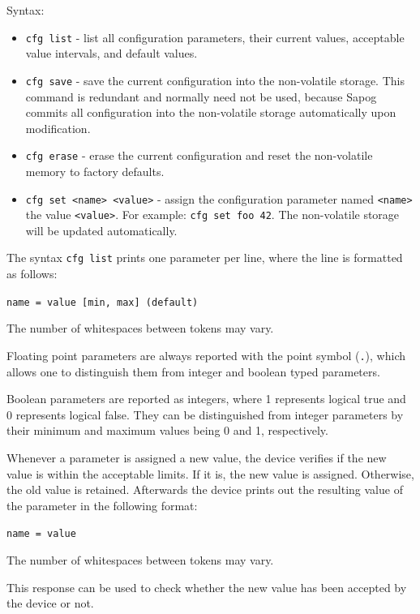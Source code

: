 \documentclass{zubaxdoc}
\begin{document}
Syntax:
\begin{itemize}
    \item \verb|cfg list| - list all configuration parameters, their current values,
          acceptable value intervals, and default values.
    
    \item \verb|cfg save| - save the current configuration into the non-volatile storage.
          This command is redundant and normally need not be used, because Sapog commits all configuration
          into the non-volatile storage automatically upon modification.
    
    \item \verb|cfg erase| - erase the current configuration and reset the non-volatile memory to factory defaults.
    
    \item \verb|cfg set <name> <value>| - assign the configuration parameter named \verb|<name>| the value
          \verb|<value>|. For example: \verb|cfg set foo 42|.
          The non-volatile storage will be updated automatically.
\end{itemize}

The syntax \verb|cfg list| prints one parameter per line, where the line is formatted as follows:

\verb|name = value [min, max] (default)|

The number of whitespaces between tokens may vary.

Floating point parameters are always reported with the point symbol (\verb|.|),
which allows one to distinguish them from integer and boolean typed parameters.

Boolean parameters are reported as integers, where 1 represents logical true and 0 represents logical false.
They can be distinguished from integer parameters by their minimum and maximum values being 0 and 1,
respectively.

Whenever a parameter is assigned a new value, the device verifies if the new value is within the
acceptable limits.
If it is, the new value is assigned. Otherwise, the old value is retained.
Afterwards the device prints out the resulting value of the parameter in the following format:

\verb|name = value|

The number of whitespaces between tokens may vary.

This response can be used to check whether the new value has been accepted by the device or not.
\end{document}
